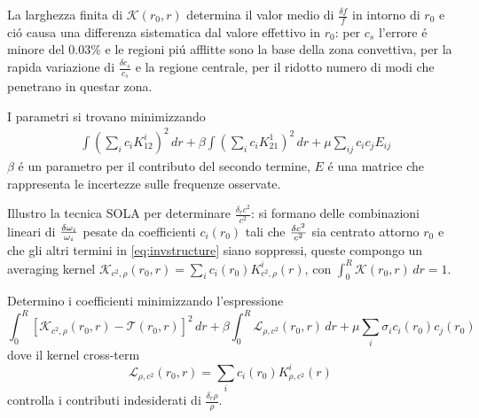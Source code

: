 \documentclass[../main.tex]{subfiles}
\begin{document}
\begin{workout}\end{workout}


La larghezza finita di $\mathcal{K}(r_0,r)$ determina il valor medio di $\frac{\delta f}{f}$ in intorno di $r_0$ e ci\'o causa una differenza sistematica  dal valore effettivo in $r_0$: per $c_s$ l'errore \'e minore del $0.03\%$ e le regioni pi\'u afflitte sono la base della zona convettiva, per la rapida variazione di $\frac{\delta c_s}{c_s}$ e la regione centrale, per il ridotto numero di modi che penetrano in questar zona.


\begin{errata}
I parametri si trovano minimizzando
\begin{align*}
&\int(\sum_ic_iK_{12}^i)^2\,dr+\beta\int(\sum_ic_iK_{21}^1)^2\,dr+\mu\sum_{ij}c_ic_jE_{ij}
\end{align*}
$\beta$ \'e un parametro per il contributo del secondo termine, $E$ \'e una matrice che rappresenta le incertezze sulle frequenze osservate.

\end{errata}

Illustro la tecnica SOLA per determinare $\frac{\delta_rc^2}{c^2}$: si formano delle combinazioni lineari di $\frac{\delta \omega_i}{\omega_i}$ pesate da coefficienti $c_i(r_0)$ tali che $\frac{\delta c^2}{c^2}$ sia centrato attorno $r_0$ e che gli altri termini in \eqref{eq:invstructure} siano soppressi, queste compongo un averaging kernel $\mathcal{K}_{c^2,\rho}(r_0,r)=\sum_ic_i(r_0)K_{c^2,\rho}^i(r)$, con $\int_0^R\mathcal{K}(r_0,r)\,dr=1$.

Determino i coefficienti minimizzando l'espressione
\begin{equation}
\int_0^R[\mathcal{K}_{c^2,\rho}(r_0,r)-\mathcal{T}(r_0,r)]^2\,dr+\beta\int_0^R\mathcal{L}_{\rho,c^2}(r_0,r)\,dr+\mu\sum_i\sigma_ic_i(r_0)c_j(r_0)
\end{equation}
dove il kernel cross-term
\begin{equation}
\mathcal{L}_{\rho,c^2}(r_0,r)=\sum_ic_i(r_0)K_{\rho,c^2}^i(r)
\end{equation}
controlla i contributi indesiderati di $\frac{\delta_r\rho}{\rho}$.

\end{document}
